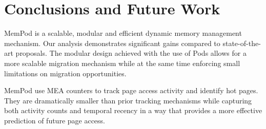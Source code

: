 \section{Conclusions and Future Work}
\label{sec:Conclusions}

MemPod is a scalable, modular and efficient dynamic memory management mechanism. Our analysis demonstrates significant gains compared to state-of-the-art proposals. The modular design achieved with the use of Pods allows for a more scalable migration mechanism while at the same time enforcing small limitations on migration opportunities.

MemPod use MEA counters to track page access activity and identify hot
pages.  They are dramatically smaller than prior tracking mechanisms
while capturing both activity counts and temporal recency in a way that
provides a more effective prediction of future page access.



